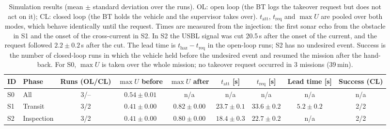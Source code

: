 \begin{table}[width=\textwidth,cols=9,pos=t]
\caption{Simulation results (mean $\pm$ standard deviation over the runs). OL: open loop (the BT logs the takeover request but does not act on it); CL: closed loop (the BT holds the vehicle and the supervisor takes over). $t_{\mathrm{att}}$, $t_{\mathrm{req}}$ and $\max U$ are pooled over both modes, which behave identically until the request. Times are measured from the injection: the first sonar echo from the obstacle in S1 and the onset of the cross-current in S2. In S2 the USBL signal was cut 20.5\,s after the onset of the current, and the request followed $2.2 \pm 0.2$\,s after the cut. The lead time is $t_{\mathrm{haz}}-t_{\mathrm{req}}$ in the open-loop runs; S2 has no undesired event. Success is the number of closed-loop runs in which the vehicle held before the undesired event and resumed the mission after the hand-back. For S0, $\max U$ is taken over the whole mission; no takeover request occurred in 3 missions (39\,min).}
\label{tab:sim-results}
\small
\begin{tabular*}{\textwidth}{@{\extracolsep{\fill}}llccccccc@{}}
\toprule
ID & Phase & Runs (OL/CL) & $\max U$ before & $\max U$ after & $t_{\mathrm{att}}$ [s] & $t_{\mathrm{req}}$ [s] & Lead time [s] & Success (CL) \\
\midrule
S0 & All & 3/-- & $0.54 \pm 0.01$ & n/a & n/a & n/a & n/a & n/a \\
S1 & Transit & 3/2 & $0.41 \pm 0.00$ & $0.82 \pm 0.00$ & $23.7 \pm 0.1$ & $33.6 \pm 0.2$ & $5.2 \pm 0.2$ & 2/2 \\
S2 & Inspection & 3/2 & $0.41 \pm 0.00$ & $0.80 \pm 0.00$ & $18.4 \pm 0.3$ & $22.7 \pm 0.2$ & n/a & 2/2 \\
\bottomrule
\end{tabular*}
\end{table}
